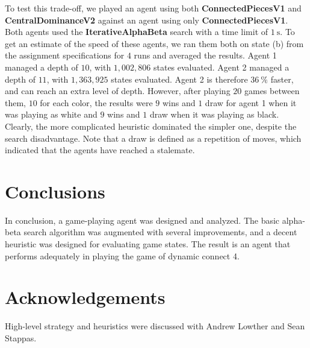 \documentclass[journal,hidelinks]{IEEEtran}
\begin{document}
To test this trade-off, we played an agent using both \textbf{ConnectedPiecesV1} and \textbf{CentralDominanceV2} against an agent using only \textbf{ConnectedPiecesV1}. Both agents used the \textbf{IterativeAlphaBeta} search with a time limit of $\SI{1}{\second}$. To get an estimate of the speed of these agents, we ran them both on state (b) from the assignment specifications for $4$ runs and averaged the results. Agent 1 managed a depth of $10$, with $1,002,806$ states evaluated. Agent 2 managed a depth of $11$, with $1,363,925$ states evaluated. Agent 2 is therefore $\SI{36}{\percent}$ faster, and can reach an extra level of depth. However, after playing $20$ games between them, $10$ for each color, the results were $9$ wins and $1$ draw for agent 1 when it was playing as white and $9$ wins and $1$ draw when it was playing as black. Clearly, the more complicated heuristic dominated the simpler one, despite the search disadvantage. Note that a draw is defined as a repetition of moves, which indicated that the agents have reached a stalemate.

\section{Conclusions}

In conclusion, a game-playing agent was designed and analyzed. The basic alpha-beta search algorithm was augmented with several improvements, and a decent heuristic was designed for evaluating game states. The result is an agent that performs adequately in playing the game of dynamic connect 4.

\section{Acknowledgements}

High-level strategy and heuristics were discussed with Andrew Lowther and Sean Stappas.



\end{document}
